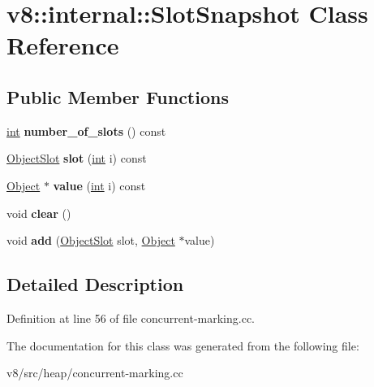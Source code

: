 \hypertarget{classv8_1_1internal_1_1SlotSnapshot}{}\section{v8\+:\+:internal\+:\+:Slot\+Snapshot Class Reference}
\label{classv8_1_1internal_1_1SlotSnapshot}
\subsection*{Public Member Functions}
\begin{DoxyCompactItemize}
\item 
\mbox{\label{classv8_1_1internal_1_1SlotSnapshot_adc0ffd77e53fd081fc02afb83e1afa88}} 
\mbox{\hyperlink{classint}{int}} {\bfseries number\+\_\+of\+\_\+slots} () const
\item 
\mbox{\label{classv8_1_1internal_1_1SlotSnapshot_a5d9e2fab49d2ccf47d37db86e92813a7}} 
\mbox{\hyperlink{classv8_1_1internal_1_1ObjectSlot}{Object\+Slot}} {\bfseries slot} (\mbox{\hyperlink{classint}{int}} i) const
\item 
\mbox{\label{classv8_1_1internal_1_1SlotSnapshot_a404f596a0aed97e932f72f7add61dafd}} 
\mbox{\hyperlink{classv8_1_1internal_1_1Object}{Object}} $\ast$ {\bfseries value} (\mbox{\hyperlink{classint}{int}} i) const
\item 
\mbox{\label{classv8_1_1internal_1_1SlotSnapshot_a5b4ad0b56c8adc8d3152fa7932871071}} 
void {\bfseries clear} ()
\item 
\mbox{\label{classv8_1_1internal_1_1SlotSnapshot_aa4c659a6c424022656867bc71ce1f96f}} 
void {\bfseries add} (\mbox{\hyperlink{classv8_1_1internal_1_1ObjectSlot}{Object\+Slot}} slot, \mbox{\hyperlink{classv8_1_1internal_1_1Object}{Object}} $\ast$value)
\end{DoxyCompactItemize}


\subsection{Detailed Description}


Definition at line 56 of file concurrent-\/marking.\+cc.



The documentation for this class was generated from the following file\+:\begin{DoxyCompactItemize}
\item 
v8/src/heap/concurrent-\/marking.\+cc\end{DoxyCompactItemize}
